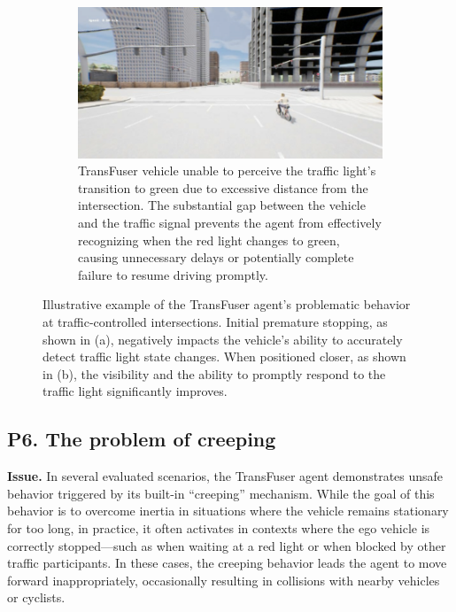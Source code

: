 \begin{figure}[htbp]
\begin{subfigure}[t]{1\columnwidth}
        \label{fig:tf_tlight_better_position}
    \end{subfigure}
    \hfill
    \begin{subfigure}[t]{1\columnwidth}
        \centering
        \includegraphics[width=\columnwidth]{images/RS18_green.png}
        \caption{TransFuser vehicle unable to perceive the traffic light's transition to green due to excessive distance from the intersection. The substantial gap between the vehicle and the traffic signal prevents the agent from effectively recognizing when the red light changes to green, causing unnecessary delays or potentially complete failure to resume driving promptly.}
        \label{fig:tf_unseen_greenlight}
    \end{subfigure}
    \caption{Illustrative example of the TransFuser agent's problematic behavior at traffic-controlled intersections. Initial premature stopping, as shown in (a), negatively impacts the vehicle’s ability to accurately detect traffic light state changes. When positioned closer, as shown in (b), the visibility and the ability to promptly respond to the traffic light significantly improves.}
    \label{fig:far_from_light}
\end{figure}

\subsection{P6. The problem of creeping}
\noindent\textbf{Issue.} In several evaluated scenarios, the TransFuser agent demonstrates unsafe behavior triggered by its built-in “creeping” mechanism. While the goal of this behavior is to overcome inertia in situations where the vehicle remains stationary for too long, in practice, it often activates in contexts where the ego vehicle is correctly stopped—such as when waiting at a red light or when blocked by other traffic participants. In these cases, the creeping behavior leads the agent to move forward inappropriately, occasionally resulting in collisions with nearby vehicles or cyclists.

